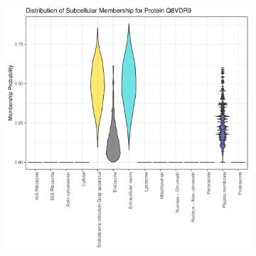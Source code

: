 \documentclass[12pt,english]{article}\usepackage[]{graphicx}\usepackage[]{color}
\makeatletter
\def\maxwidth{ %
  \ifdim\Gin@nat@width>\linewidth
    \linewidth
  \else
    \Gin@nat@width
  \fi
}
\newenvironment{knitrout}{}{} %
\makeatother
\begin{document}
\begin{figure}[h]
  \centering
  \begin{subfigure}[t]{0.5\textwidth}
    \centering
\begin{knitrout}
\color{fgcolor}

{\centering \includegraphics[width=\maxwidth]{figure/Q8VDR9-prob-1} 

}



\end{knitrout}
    \caption{}
  \end{subfigure}%
  \begin{subfigure}[t]{0.5\textwidth}
    \centering
\begin{knitrout}
\color{fgcolor}


\end{knitrout}
\end{subfigure}
\end{figure}
\end{document}
